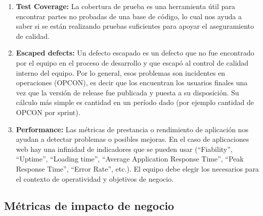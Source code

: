   \begin{enumerate}    

  \item {\textbf{Test Coverage:} La cobertura de prueba es una herramienta útil para encontrar partes no probadas de una base de código, lo cual nos ayuda a saber si se están realizando pruebas suficientes para apoyar el aseguramiento de calidad.
}

  \item {\textbf{Escaped defects:}
Un defecto escapado es un defecto que no fue encontrado por el equipo en el proceso de desarrollo y que escapó al control de calidad interno del equipo. Por lo general, esos problemas son incidentes en operaciones (OPCON), es decir que los encuentran los usuarios finales una vez que la versión de release fue publicada y puesta a su disposición. Su cálculo más simple es cantidad en un período dado (por ejemplo cantidad de OPCON por sprint).
}

  \item {\textbf{Performance:}
Las métricas de prestancia o rendimiento de aplicación nos ayudan a detectar problemas o posibles mejoras. En el caso de aplicaciones web hay una infinidad de indicadores que se pueden usar (“Fiability”, “Uptime”, “Loading time”, “Average Application Response Time”, “Peak Response Time”, “Error Rate”, etc.). El equipo debe elegir los necesarios para el contexto de operatividad y objetivos de negocio.
}

  \end{enumerate}

\subsection{Métricas de impacto de negocio}

